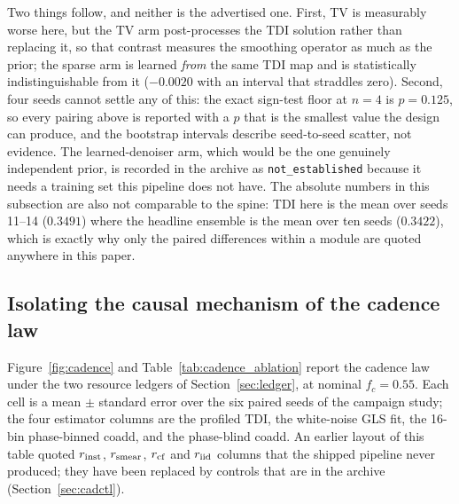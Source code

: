 \documentclass[twocolumn,10pt]{article}
\begin{document}
Two things follow, and neither is the advertised one. First, TV is measurably
worse here, but the TV arm post-processes the TDI solution rather than replacing
it, so that contrast measures the smoothing operator as much as the prior; the
sparse arm is learned \emph{from} the same TDI map and is statistically
indistinguishable from it ($-0.0020$ with an interval that straddles zero).
Second, four seeds cannot settle any of this: the exact sign-test floor at
$n=4$ is $p=0.125$, so every pairing above is reported with a $p$ that is the
smallest value the design can produce, and the bootstrap intervals describe
seed-to-seed scatter, not evidence. The learned-denoiser arm, which would be the
one genuinely independent prior, is recorded in the archive as
{\tt not\_established} because it needs a training set this pipeline does not
have. The absolute numbers in this subsection are also not comparable to the
spine: TDI here is the mean over seeds 11--14 ($0.3491$) where the headline
ensemble is the mean over ten seeds ($0.3422$), which is exactly why only the
paired differences within a module are quoted anywhere in this paper.

\subsection{Isolating the causal mechanism of the cadence law}
\label{sec:cadence}
Figure~\ref{fig:cadence} and Table~\ref{tab:cadence_ablation} report the
cadence law under the two resource ledgers of Section~\ref{sec:ledger}, at
nominal $f_c=0.55$. Each cell is a mean $\pm$ standard error over the six
paired seeds of the campaign study; the four estimator columns are the
profiled TDI, the white-noise GLS fit, the 16-bin phase-binned coadd, and the
phase-blind coadd. An earlier layout of this table quoted $r_{\rm inst}$,
$r_{\rm smear}$, $r_{\rm cf}$ and $r_{\rm iid}$ columns that the shipped
pipeline never produced; they have been replaced by controls that are in the
archive (Section~\ref{sec:cadctl}).
\end{document}
